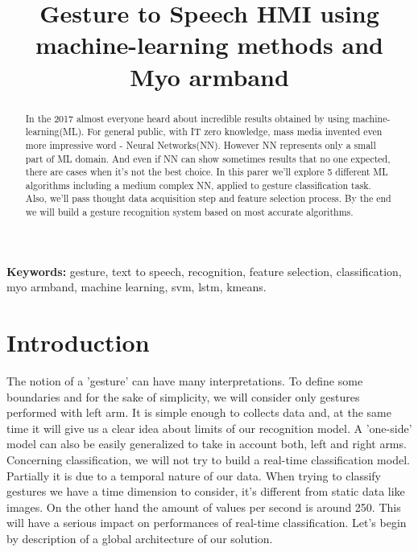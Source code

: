 \documentclass[conference,compsoc]{IEEEtran}
\begin{document}
\title{Gesture to Speech HMI using machine-learning methods and Myo armband}

\author{
\and
{}
}
\maketitle


\begin{abstract}
In the 2017 almost everyone heard about incredible results obtained by using machine-learning(ML). For general public, with IT zero knowledge, mass media invented even more impressive word - Neural Networks(NN). However NN represents only a small part of ML domain. And even if NN can show sometimes results that no one expected, there are cases when it's not the best choice. In this parer we'll explore 5 different ML algorithms including a medium complex NN, applied to gesture classification task. Also, we'll pass thought data acquisition step and feature selection process. By the end we will build a gesture recognition system based on most accurate algorithms.


\end{abstract}
\textbf{Keywords:} gesture, text to speech, recognition, feature selection, classification, myo armband, machine learning, svm, lstm, kmeans.

\IEEEpeerreviewmaketitle

\section{Introduction}
The notion of a 'gesture' can have many interpretations. To define some boundaries and for the sake of simplicity, we will consider only gestures performed with left arm. It is simple enough to collects data and, at the same time it will give us a clear idea about limits of our recognition model. A 'one-side' model can also be easily generalized to take in account both, left and right arms. Concerning classification, we will not try to build a real-time classification model. Partially it is due to a temporal nature of our data. When trying to classify gestures we have a time dimension to consider, it's different from static data like images. On the other hand the amount of values per second is around 250. This will have a serious impact on performances of real-time classification. Let's begin by description of a global architecture of our solution.
\end{document}
